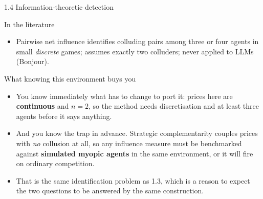\documentclass[aspectratio=169,9pt]{beamer}
\newcommand{\orange}[1]{\textcolor{AmazonOrange}{\textbf{#1}}}
\newcommand{\blue}[1]{\textcolor{densityblue}{\textbf{#1}}}
\begin{document}
\begin{frame}{1.4 Information-theoretic detection}
\begin{block}{In the literature}
\begin{itemize}
    \item Pairwise net influence identifies colluding pairs among three or four agents in small
    \textit{discrete} games; assumes exactly two colluders; never applied to LLMs (Bonjour).
\end{itemize}
\end{block}
\pause
\vspace{0.1cm}
\begin{block}{What knowing this environment buys you}
\begin{itemize}
    \item You know immediately what has to change to port it: prices here are \orange{continuous} and $n = 2$,
    so the method needs discretisation and at least three agents before it says anything.
    \item And you know the trap in advance. Strategic complementarity couples prices with \textit{no} collusion
    at all, so any influence measure must be benchmarked against \blue{simulated myopic agents} in the same
    environment, or it will fire on ordinary competition.
    \item That is the same identification problem as 1.3, which is a reason to expect the two questions to be
    answered by the same construction.
\end{itemize}
\end{block}
\end{frame}
\end{document}
